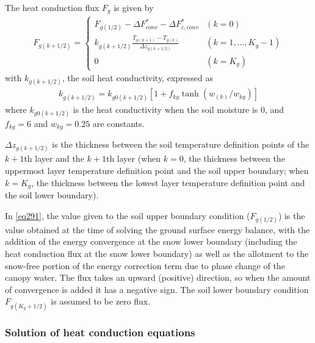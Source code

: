The heat conduction flux \(F_{g}\) is given by \begin{eqnarray}
 F_{g(k+1/2)} =
\left\{
\begin{array}{ll}
F_{g(1/2)} - \Delta F_{conv}^\ast - \Delta F_{c,conv}^\ast
 & (k=0)\\
\displaystyle{
k_{g(k+1/2)} \frac{T_{g(k+1)} - T_{g(k)}}{\Delta z_{g(k+1/2)}}
}
 & (k=1,\ldots,K_{g}-1) \\
\displaystyle{
0
}
 & (k=K_{g})
\end{array}
\right. \label{eq291}
\end{eqnarray} with \(k_{g(k+1/2)}\), the soil heat conductivity, expressed as \begin{eqnarray}
 k_{g(k+1/2)} = k_{g0(k+1/2)} [ 1 + f_{kg} \tanh( w_{(k)}/ w_{kg} ) ]
\end{eqnarray} where \(k_{g0(k+1/2)}\) is the heat conductivity when the soil moisture is 0, and \(f_{kg}=6\) and \(w_{kg}=0.25\) are constants.

\(\Delta z_{g(k+1/2)}\) is the thickness between the soil temperature definition points of the \(k+1\)th layer and the \(k+1\)th layer (when \(k=0\), the thickness between the uppermost layer
temperature definition point and the soil upper boundary; when \(k=K_g\), the thickness between the lowest layer temperature definition point and the soil lower boundary).

In \ref{eq291}, the value given to the soil upper boundary condition (\(F_{g(1/2)}\)) is the value obtained at the time of solving the ground surface energy balance, with the addition
of the energy convergence at the snow lower boundary (including the heat conduction flux at the snow lower boundary) as well as the allotment to the snow-free portion of the energy correction term due
to phase change of the canopy water. The flux takes an upward (positive) direction, so when the amount of convergence is added it has a negative sign. The soil lower boundary condition
\(F_{g(K_g+1/2)}\) is assumed to be zero flux.

\hypertarget{solution-of-heat-conduction-equations}{%
\subsubsection{Solution of heat conduction equations}\label{solution-of-heat-conduction-equations}}


